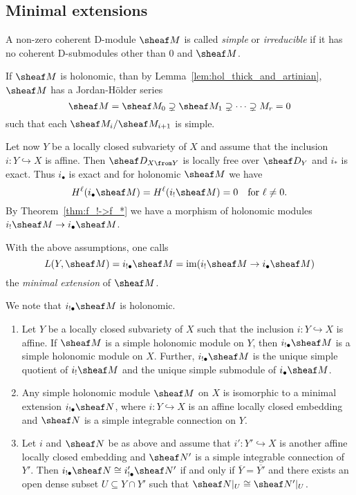 \documentclass[number-in-sections,a4paper]{notes}
\begin{document}
\iffalse

\subsection{Minimal extensions}

\begin{Definition}
    A non-zero coherent D-module $\sheaf M$ is called \emph{simple} or \emph{irreducible} if it has no coherent D-submodules other than $0$ and $\sheaf M$.
\end{Definition}

If $\sheaf M$ is holonomic, than by Lemma~\ref{lem:hol_thick_and_artinian}, $\sheaf M$ has a Jordan-H\"older series
\[
    \sheaf M = \sheaf M_0 \supsetneq \sheaf M_1 \supsetneq \dots \supsetneq M_r = 0
\]
such that each $\sheaf M_i/\sheaf M_{i+1}$ is simple.

Let now $Y$ be a locally closed subvariety of $X$ and assume that the inclusion $i\colon Y \hookrightarrow X$ is affine.
Then $\sD_{X \from Y}$ is locally free over $\sD_Y$ and $i_*$ is exact.
Thus $i_\bullet$ is exact and for holonomic $\sheaf M$ we have
\[
    H^\ell(i_\bullet \sheaf M) = H^\ell(i_!\sheaf M) = 0 \quad\text{for } \ell \ne 0.
\]
By Theorem~\ref{thm:f_!->f_*} we have a morphism of holonomic modules $i_!\sheaf M \to i_\bullet \sheaf M$.

\begin{Definition}
    With the above assumptions, one calls
    \[
        L(Y,\sheaf M) = i_{!\bullet}\sheaf M = \im(i_!\sheaf M \to i_\bullet\sheaf M)
    \]
    the \emph{minimal extension} of $\sheaf M$.
\end{Definition}

We note that $i_{!\bullet}\sheaf M$ is holonomic.

\begin{Theorem}\leavevmode
    \begin{enumerate}
        \item Let $Y$ be a locally closed subvariety of $X$ such that the inclusion $i\colon Y \hookrightarrow X$ is affine.
            If $\sheaf M$ is a simple holonomic module on $Y$, then $i_{!\bullet}\sheaf M$ is a simple holonomic module on $X$.
            Further, $i_{!\bullet}\sheaf M$ is the unique simple quotient of $i_!\sheaf M$ and the unique simple submodule of $i_\bullet\sheaf M$.
        \item Any simple holonomic module $\sheaf M$ on $X$ is isomorphic to a minimal extension $i_{!\bullet}\sheaf N$, where $i\colon Y \hookrightarrow X$ is an affine locally closed embedding and $\sheaf N$ is a simple integrable connection on $Y$.
        \item Let $i$ and $\sheaf N$ be as above and assume that $i'\colon Y'\hookrightarrow X$ is another affine locally closed embedding and $\sheaf N'$ is a simple integrable connection of $Y'$.
            Then $i_{!\bullet}\sheaf N \cong i'_{!\bullet}\sheaf N'$ if and only if $\overline{Y} = \overline{Y'}$ and there exists an open dense subset $U \subseteq Y \cap Y'$ such that $\res{\sheaf N}{U} \cong \res{\sheaf N'}{U}$.
    \end{enumerate}
\end{Theorem}
\end{document}
